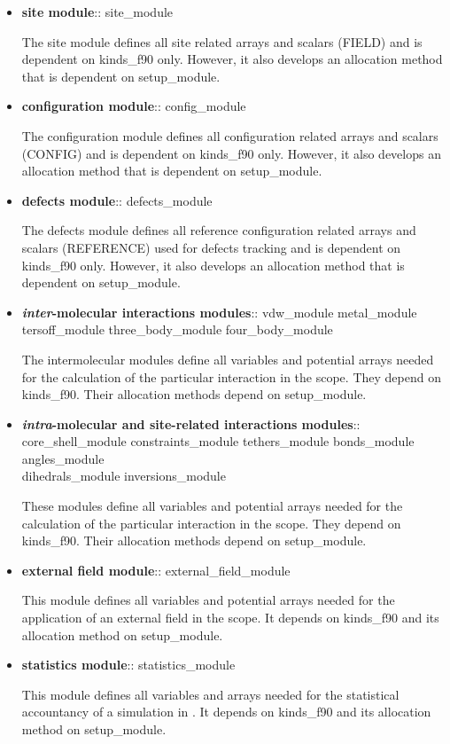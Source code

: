 \begin{itemize}
\item {\bf site module}:: {\sc site\_module}

The site module defines all site related arrays and scalars (FIELD)
and is dependent on {\sc kinds\_f90} only.  However, it also develops
an allocation method that is dependent on {\sc setup\_module}.

\item {\bf configuration module}:: {\sc config\_module}

The configuration module defines all configuration related arrays
and scalars (CONFIG) and is dependent on {\sc kinds\_f90} only.
However, it also develops an allocation method that is dependent
on {\sc setup\_module}.

\item {\bf defects module}:: {\sc defects\_module}

The defects module defines all reference configuration related
arrays and scalars (REFERENCE) used for defects tracking and is
dependent on {\sc kinds\_f90} only.  However, it also develops
an allocation method that is dependent on {\sc setup\_module}.

\item {\bf {\em inter}-molecular interactions modules}:: {\sc
vdw\_module metal\_module \\
tersoff\_module three\_body\_module four\_body\_module}

The intermolecular modules define all variables and potential
arrays needed for the calculation of the particular interaction in
the \D scope.  They depend on {\sc kinds\_f90}.  Their allocation
methods depend on {\sc setup\_module}.

\item {\bf {\em intra}-molecular and site-related interactions
modules}:: {\sc core\_shell\_module constraints\_module
tethers\_module bonds\_module angles\_module \\
dihedrals\_module inversions\_module}

These modules define all variables and potential arrays needed for
the calculation of the particular interaction in the \D scope.
They depend on {\sc kinds\_f90}.  Their allocation methods depend
on {\sc setup\_module}.

\item {\bf external field module}:: {\sc external\_field\_module}

This module defines all variables and potential arrays needed for
the application of an external field in the \D scope.  It depends
on {\sc kinds\_f90} and its allocation method on {\sc
setup\_module}.

\item {\bf statistics module}:: {\sc statistics\_module}

This module defines all variables and arrays needed for the
statistical accountancy of a simulation in \D.  It depends on {\sc
kinds\_f90} and its allocation method on {\sc setup\_module}.

\end{itemize}
